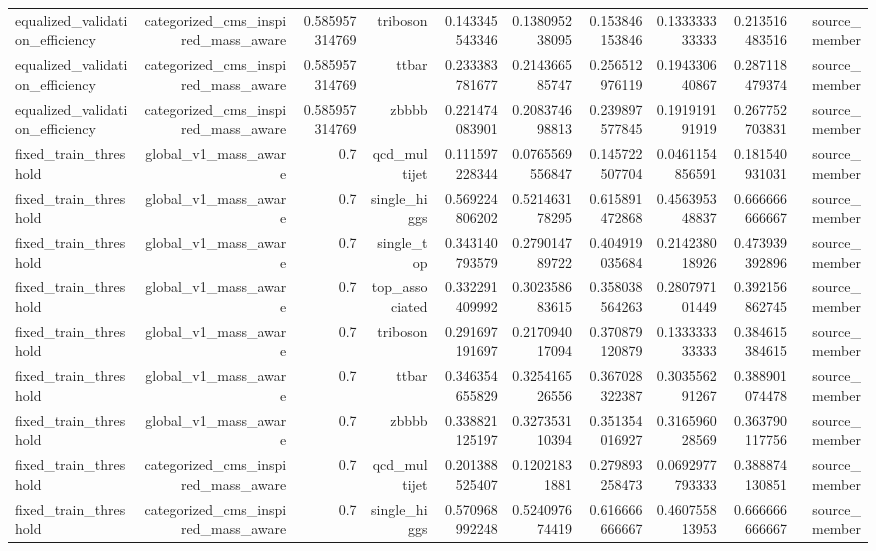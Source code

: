 \begin{table}[htbp]
{\begin{tabular}{lrrrrrrrrr}
equalized\_validation\_efficiency & categorized\_cms\_inspired\_mass\_aware & 0.585957314769 & triboson & 0.143345543346 & 0.138095238095 & 0.153846153846 & 0.133333333333 & 0.213516483516 & source\_member \\
equalized\_validation\_efficiency & categorized\_cms\_inspired\_mass\_aware & 0.585957314769 & ttbar & 0.233383781677 & 0.214366585747 & 0.256512976119 & 0.194330640867 & 0.287118479374 & source\_member \\
equalized\_validation\_efficiency & categorized\_cms\_inspired\_mass\_aware & 0.585957314769 & zbbbb & 0.221474083901 & 0.208374698813 & 0.239897577845 & 0.191919191919 & 0.267752703831 & source\_member \\
fixed\_train\_threshold & global\_v1\_mass\_aware & 0.7 & qcd\_multijet & 0.111597228344 & 0.0765569556847 & 0.145722507704 & 0.0461154856591 & 0.181540931031 & source\_member \\
fixed\_train\_threshold & global\_v1\_mass\_aware & 0.7 & single\_higgs & 0.569224806202 & 0.521463178295 & 0.615891472868 & 0.456395348837 & 0.666666666667 & source\_member \\
fixed\_train\_threshold & global\_v1\_mass\_aware & 0.7 & single\_top & 0.343140793579 & 0.279014789722 & 0.404919035684 & 0.214238018926 & 0.473939392896 & source\_member \\
fixed\_train\_threshold & global\_v1\_mass\_aware & 0.7 & top\_associated & 0.332291409992 & 0.302358683615 & 0.358038564263 & 0.280797101449 & 0.392156862745 & source\_member \\
fixed\_train\_threshold & global\_v1\_mass\_aware & 0.7 & triboson & 0.291697191697 & 0.217094017094 & 0.370879120879 & 0.133333333333 & 0.384615384615 & source\_member \\
fixed\_train\_threshold & global\_v1\_mass\_aware & 0.7 & ttbar & 0.346354655829 & 0.325416526556 & 0.367028322387 & 0.303556291267 & 0.388901074478 & source\_member \\
fixed\_train\_threshold & global\_v1\_mass\_aware & 0.7 & zbbbb & 0.338821125197 & 0.327353110394 & 0.351354016927 & 0.316596028569 & 0.363790117756 & source\_member \\
fixed\_train\_threshold & categorized\_cms\_inspired\_mass\_aware & 0.7 & qcd\_multijet & 0.201388525407 & 0.12021831881 & 0.279893258473 & 0.0692977793333 & 0.388874130851 & source\_member \\
fixed\_train\_threshold & categorized\_cms\_inspired\_mass\_aware & 0.7 & single\_higgs & 0.570968992248 & 0.524097674419 & 0.616666666667 & 0.460755813953 & 0.666666666667 & source\_member \\

\end{tabular}}
\end{table}
